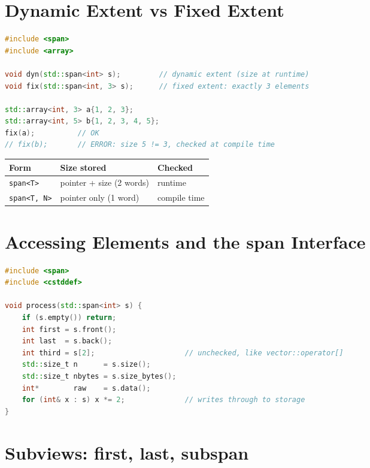\section{Dynamic Extent vs Fixed Extent}
\label{sec:c20-span-extent}

\begin{lstlisting}[language=C++,caption={Dynamic vs fixed extent}]
#include <span>
#include <array>

void dyn(std::span<int> s);         // dynamic extent (size at runtime)
void fix(std::span<int, 3> s);      // fixed extent: exactly 3 elements

std::array<int, 3> a{1, 2, 3};
std::array<int, 5> b{1, 2, 3, 4, 5};
fix(a);          // OK
// fix(b);       // ERROR: size 5 != 3, checked at compile time
\end{lstlisting}

\begin{center}
\begin{tabular}{lll}
\hline
\textbf{Form} & \textbf{Size stored} & \textbf{Checked} \\
\hline
\texttt{span<T>} & pointer + size (2 words) & runtime \\
\texttt{span<T, N>} & pointer only (1 word) & compile time \\
\hline
\end{tabular}
\end{center}

\section{Accessing Elements and the span Interface}
\label{sec:c20-span-access}

\begin{lstlisting}[language=C++,caption={The span access interface}]
#include <span>
#include <cstddef>

void process(std::span<int> s) {
    if (s.empty()) return;
    int first = s.front();
    int last  = s.back();
    int third = s[2];                     // unchecked, like vector::operator[]
    std::size_t n      = s.size();
    std::size_t nbytes = s.size_bytes();
    int*        raw    = s.data();
    for (int& x : s) x *= 2;              // writes through to storage
}
\end{lstlisting}

\section{Subviews: first, last, subspan}
\label{sec:c20-span-subviews}

